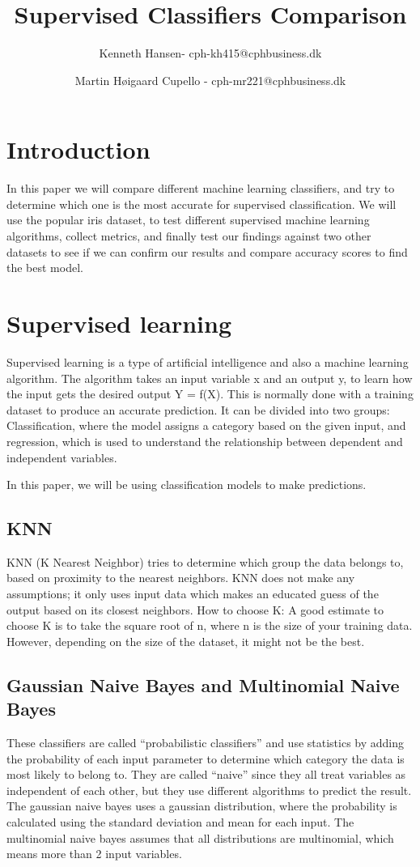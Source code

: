 \documentclass{article}
\author{Kenneth Hansen- cph-kh415@cphbusiness.dk
    \and Martin Høigaard Cupello - cph-mr221@cphbusiness.dk}
\title{Supervised Classifiers Comparison}
\begin{document}
\maketitle
\thispagestyle{empty}
\tableofcontents
\clearpage

\section{Introduction}
In this paper we will compare different machine learning classifiers, and try to determine which one is the most accurate for supervised classification. We will use the popular iris dataset, to test different supervised machine learning algorithms, collect metrics, and finally test our findings against two other datasets to see if we can confirm our results and compare accuracy scores to find the best model.

\section{Supervised learning}
Supervised learning is a type of artificial intelligence and also a machine learning algorithm. The algorithm takes an input variable x and an output y, to learn how the input gets the desired output Y = f(X). This is normally done with a training dataset to produce an accurate prediction. It can be divided into two groups: Classification, where the model assigns a category based on the given input,  and regression, which is used to understand the relationship between dependent and independent variables.

In this paper, we will be using classification models to make predictions.

\subsection{KNN}
KNN (K Nearest Neighbor) tries to determine which group the data belongs to, based on proximity to the nearest neighbors.
KNN does not make any assumptions; it only uses input data which makes an educated guess of the output based on its closest neighbors.
How to choose K:
A good estimate to choose K is to take the square root of n, where n is the size of your training data. However, depending on the size of the dataset, it might not be the best.

\subsection{Gaussian Naive Bayes and Multinomial Naive Bayes}
These classifiers are called “probabilistic classifiers” and use statistics by adding the probability of each input parameter to determine which category the data is most likely to belong to. They are called “naive” since they all treat variables as independent of each other, but they use different algorithms to predict the result.
The gaussian naive bayes uses a gaussian distribution, where the probability is calculated using the standard deviation and mean for each input.
The multinomial naive bayes assumes that all distributions are multinomial, which means more than 2 input variables.
\end{document}
